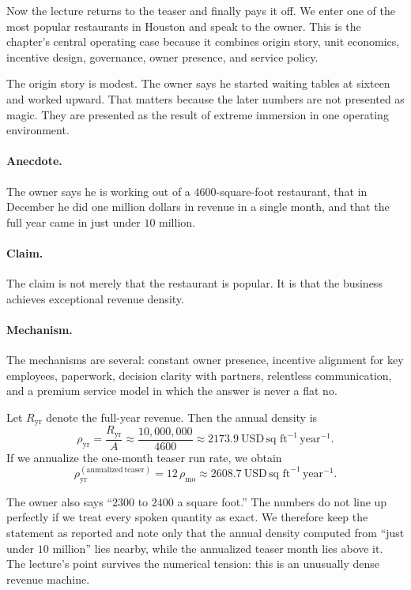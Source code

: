 Now the lecture returns to the teaser and finally pays it off. We enter one of the most popular restaurants in Houston and speak to the owner. This is the chapter's central operating case because it combines origin story, unit economics, incentive design, governance, owner presence, and service policy.

The origin story is modest. The owner says he started waiting tables at sixteen and worked upward. That matters because the later numbers are not presented as magic. They are presented as the result of extreme immersion in one operating environment.

\paragraph{Anecdote.} The owner says he is working out of a \(4600\)-square-foot restaurant, that in December he did one million dollars in revenue in a single month, and that the full year came in just under \(10\) million.

\paragraph{Claim.} The claim is not merely that the restaurant is popular. It is that the business achieves exceptional revenue density.

\paragraph{Mechanism.} The mechanisms are several: constant owner presence, incentive alignment for key employees, paperwork, decision clarity with partners, relentless communication, and a premium service model in which the answer is never a flat no.

Let \(R_{\mathrm{yr}}\) denote the full-year revenue. Then the annual density is
\begin{equation}
\rho_{\mathrm{yr}}
=
\frac{R_{\mathrm{yr}}}{A}
\approx
\frac{10{,}000{,}000}{4600}
\approx
2173.9\ \text{USD}\,\text{sq ft}^{-1}\,\text{year}^{-1}.
\end{equation}
If we annualize the one-month teaser run rate, we obtain
\begin{equation}
\rho_{\mathrm{yr}}^{(\mathrm{annualized\ teaser})}
=
12\,\rho_{\mathrm{mo}}
\approx
2608.7\ \text{USD}\,\text{sq ft}^{-1}\,\text{year}^{-1}.
\end{equation}

The owner also says ``\(2300\) to \(2400\) a square foot.'' The numbers do not line up perfectly if we treat every spoken quantity as exact. We therefore keep the statement as reported and note only that the annual density computed from ``just under \(10\) million'' lies nearby, while the annualized teaser month lies above it. The lecture's point survives the numerical tension: this is an unusually dense revenue machine.


